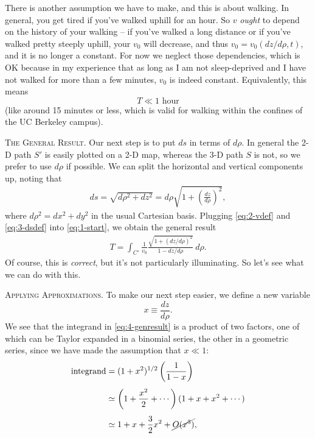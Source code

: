 \documentclass[12pt]{article}
\begin{document}
\vspace{10pt} There is another assumption we have to make, and this is about walking. In general, you get tired if you've walked uphill for an hour. So $v$ \textit{ought} to depend on the history of your walking -- if you've walked a long distance or if you've walked pretty steeply uphill, your $v_{0}$ will decrease, and thus $v_{0} = v_{0}(dz/d\rho, t)$, and it is no longer a constant. For now we neglect those dependencies, which is OK because in my experience that as long as I am not sleep-deprived and I have not walked for more than a few minutes, $v_{0}$ is indeed constant. Equivalently, this means
$$
T \ll 1 \text{ hour}
$$
(like around 15 minutes or less, which is valid for walking within the confines of the UC Berkeley campus).

\vspace{10pt} \textsc{The General Result.} Our next step is to put $ds$ in terms of $d\rho$. In general the 2-D path $S'$ is easily plotted on a 2-D map, whereas the 3-D path $S$ is not, so we prefer to use $d\rho$ if possible. We can split the horizontal and vertical components up, noting that
\begin{align} \label{eq:3-dsdef}
ds = \sqrt{d\rho^2 + dz ^2} = d\rho \sqrt{ 1+ \left( \frac{dz}{d\rho}\right)^2},
\end{align}
where $d\rho^2 = dx^2 + dy^2$ in the usual Cartesian basis. Plugging \eqref{eq:2-vdef} and \eqref{eq:3-dsdef} into \eqref{eq:1-start}, we obtain the general result
\begin{align} \label{eq:4-genresult}
\boxed{T = \int_{C'} \frac{1}{v_{0}} \frac{\sqrt{1+ (dz/d\rho)^2}} {1- dz/d\rho} \: d\rho}.
\end{align}
Of course, this is \textit{correct}, but it's not particularly illuminating. So let's see what we can do with this.

\vspace{10pt}\textsc{Applying Approximations.} To make our next step easier, we define a new variable
$$
x \equiv \frac{dz}{d\rho}.
$$
We see that the integrand in \eqref{eq:4-genresult} is a product of two factors, one of which can be Taylor expanded in a binomial series, the other in a geometric series, since we have made the assumption that $x \ll 1$:
\begin{align}
\nonumber \text{integrand} &= (1+x^2)^{1/2}\left(\frac{1}{1-x}\right) \\[0.4em]
 \nonumber & \simeq \left(1 + \frac{x^2}{2} + \cdots \right) (1 + x + x^2 + \cdots) \\[0.4em]
 &\simeq 1 + x + \frac{3}{2}x^2 + \cancel{O(x^3)}, \label{eq:5-expand}
\end{align}
\end{document}
